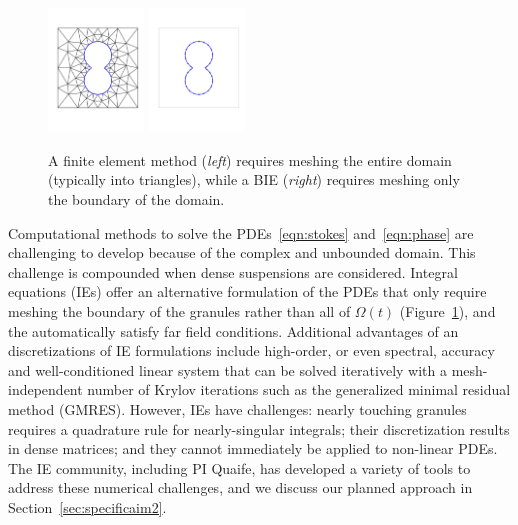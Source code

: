 \begin{figure}
  \centering
  \includegraphics[width=1in]{figures/Background/Peanut/PeanutFEM.pdf}
  \includegraphics[width=1in]{figures/Background/Peanut/PeanutIE.pdf}
  \caption{\label{fig:fem_vs_bie} \footnotesize A finite element method
  ({\em left}) requires meshing the entire domain (typically into
  triangles), while a BIE ({\em right}) requires meshing only the
  boundary of the domain.}
\end{figure}

Computational methods to solve the PDEs~\eqref{eqn:stokes}
and~\eqref{eqn:phase} are challenging to develop because of the complex
and unbounded domain. This challenge is compounded when dense
suspensions are considered. Integral equations (IEs) offer an
alternative formulation of the PDEs that only require meshing the
boundary of the granules rather than all of $\Omega(t)$
(Figure~\ref{fig:fem_vs_bie}), and the automatically satisfy far field
conditions. Additional advantages of an discretizations of IE
formulations include high-order, or even spectral, accuracy and
well-conditioned linear system that can be solved iteratively with a
mesh-independent number of Krylov iterations such as the generalized
minimal residual method (GMRES). However, IEs have challenges: nearly
touching granules requires a quadrature rule for nearly-singular
integrals; their discretization results in dense matrices; and they
cannot immediately be applied to non-linear PDEs. The IE community,
including PI Quaife, has developed a variety of tools to address these
numerical challenges, and we discuss our planned approach in
Section~\ref{sec:specificaim2}.

